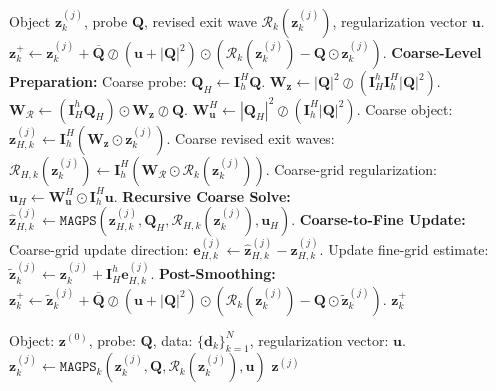 \documentclass{article}
\numberwithin{equation}{section}
\begin{document}
\begin{algorithm}
\caption{$\texttt{MAGPS}\left(\bm{z}^{(j)}_k, \bm{Q}, \mathcal{R}_k\left(\bm{z}_k^{(j)}\right),\bm{u}\right)$}
\label{alg:MAGPS}
\begin{algorithmic}[1]
\REQUIRE  Object $\bm{z}^{(j)}_k$, probe $\bm{Q}$, revised exit wave $\mathcal{R}_k\left(\bm{z}_k^{(j)}\right)$, regularization vector $\bm{u}$.
    \STATE 
    $\bm{z}^+_k \leftarrow \bm{z}_k^{(j)} + \overline{\bm{Q}}\oslash\left(\bm{u} + |\bm{Q}|^2\right)\odot\left(\mathcal{R}_k\left(\bm{z}_k^{(j)}\right) - \bm{Q}\odot\bm{z}_k^{(j)}\right)$.
\ELSE
    \STATE \textbf{Coarse-Level Preparation:}
    \STATE Coarse probe: $\bm{Q}_H \leftarrow \bm{I}_h^H\bm{Q}$.
     $\bm{W}_{\bm{z}} \leftarrow |\bm{Q}|^2\oslash\left(\bm{I}_H^h\bm{I}_h^H|\bm{Q}|^2\right)$.
     $\bm{W}_{\mathcal{R}} \leftarrow (\bm{I}_H^h\bm{Q}_H)\odot\bm{W}_{\bm{z}}\oslash\bm{Q}$.
     $\bm{W}_{\bm{u}}^H \leftarrow |\bm{Q}_H|^2\oslash\left(\bm{I}_h^H|\bm{Q}|^2\right)$.
    \STATE Coarse object: $\bm{z}^{(j)}_{H,k} \leftarrow \bm{I}_h^H\left(\bm{W}_{\bm{z}}\odot\bm{z}^{(j)}_k\right)$.
    \STATE Coarse revised exit waves: $\mathcal{R}_{H,k}\left(\bm{z}_k^{(j)}\right) \leftarrow \bm{I}_h^H\left(\bm{W}_{\mathcal{R}}\odot\mathcal{R}_k\left(\bm{z}_k^{(j)}\right)\right)$.
    \STATE Coarse-grid regularization: $\bm{u}_H \leftarrow \bm{W}_{\bm{u}}^H\odot\bm{I}_h^H\bm{u}$.
    \STATE \textbf{Recursive Coarse Solve:}
    \STATE $\widehat{\bm{z}}^{(j)}_{H,k} \leftarrow \texttt{MAGPS}\left(\bm{z}^{(j)}_{H,k}, \bm{Q}_H,  \mathcal{R}_{H,k}\left(\bm{z}_k^{(j)}\right), \bm{u}_H\right)$.
    \STATE \textbf{Coarse-to-Fine Update:}
    \STATE Coarse-grid update direction: $\bm{e}^{(j)}_{H,k} \leftarrow \widehat{\bm{z}}^{(j)}_{H,k} - \bm{z}^{(j)}_{H,k}$.
    \STATE Update fine-grid estimate: $\widetilde{\bm{z}}^{(j)}_{k} \leftarrow \bm{z}^{(j)}_k + \bm{I}_H^h\bm{e}^{(j)}_{H,k}$.
    \STATE \textbf{Post-Smoothing:}
    \STATE $\bm{z}^+_k \leftarrow \widetilde{\bm{z}}^{(j)}_{k} + \overline{\bm{Q}}\oslash\left(\bm{u} + |\bm{Q}|^2\right)\odot\left(\mathcal{R}_k\left(\bm{z}_k^{(j)}\right) - \bm{Q}\odot\widetilde{\bm{z}}^{(j)}_{k}\right)$.
\ENDIF
\RETURN $\bm{z}^+_k$
\end{algorithmic}
\end{algorithm}

\begin{algorithm}
\caption{$\texttt{MAGPIE}(\bm{z}^{(0)},\bm{Q},\{\bm{d}_k\}_{k=1}^N,\bm{u})$}\label{alg:MAGPIE}
\begin{algorithmic}[1]
\REQUIRE Object: $\bm{z}^{(0)}$, probe: $\bm{Q}$, data: $\{\bm{d}_k\}_{k=1}^N$, regularization vector: $\bm{u}$.
        \STATE $\bm{z}_k^{(j)}\leftarrow \texttt{MAGPS}_k\left(\bm{z}^{(j)}_k, \bm{Q}, \mathcal{R}_k\left(\bm{z}^{(j)}_k\right),\bm{u}\right)$
    \ENDFOR
\ENDWHILE
\RETURN $\bm{z}^{(j)}$
\end{algorithmic}
\end{algorithm}
\end{document}
